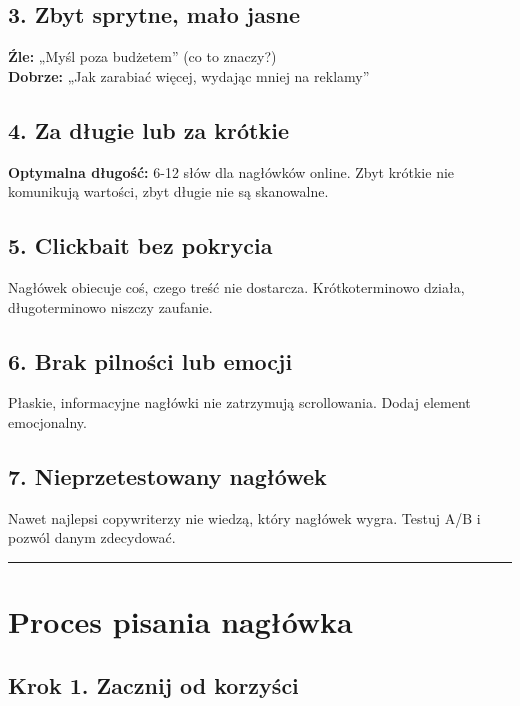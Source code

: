 \documentclass[
  12pt,
  a4paper,
  twoside,
  openright,
  12pt,
  DIV=12,
  BCOR=12mm]{scrbook}
\newcommand{\decoline}{%
  \begin{center}
    \textcolor{bordergray}{\rule{0.3\textwidth}{0.5pt}}
  \end{center}
}
\begin{document}
\subsection{3. Zbyt sprytne, mało
jasne}\label{zbyt-sprytne-maux142o-jasne}

\textbf{Źle:} „Myśl poza budżetem'' (co to znaczy?)\\
\textbf{Dobrze:} „Jak zarabiać więcej, wydając mniej na reklamy''

\subsection{4. Za długie lub za
krótkie}\label{za-dux142ugie-lub-za-kruxf3tkie}

\textbf{Optymalna długość:} 6-12 słów dla nagłówków online. Zbyt krótkie
nie komunikują wartości, zbyt długie nie są skanowalne.

\subsection{5. Clickbait bez pokrycia}\label{clickbait-bez-pokrycia}

Nagłówek obiecuje coś, czego treść nie dostarcza. Krótkoterminowo
działa, długoterminowo niszczy zaufanie.

\subsection{6. Brak pilności lub
emocji}\label{brak-pilnoux15bci-lub-emocji}

Płaskie, informacyjne nagłówki nie zatrzymują scrollowania. Dodaj
element emocjonalny.

\subsection{7. Nieprzetestowany
nagłówek}\label{nieprzetestowany-nagux142uxf3wek}

Nawet najlepsi copywriterzy nie wiedzą, który nagłówek wygra. Testuj A/B
i pozwól danym zdecydować.

\decoline

\section{Proces pisania nagłówka}\label{proces-pisania-nagux142uxf3wka}

\subsection{Krok 1. Zacznij od
korzyści}\label{krok-1.-zacznij-od-korzyux15bci}
\end{document}
